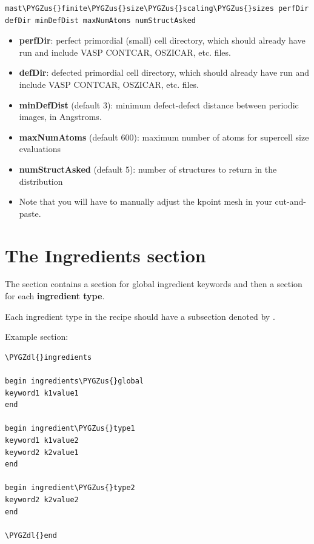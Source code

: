 \documentclass[letterpaper,10pt,english]{sphinxmanual}
\def\PYGZus{\char`\_}
\def\PYGZdl{\char`\$}
\begin{document}
\begin{Verbatim}[commandchars=\\\{\}]
mast\PYGZus{}finite\PYGZus{}size\PYGZus{}scaling\PYGZus{}sizes perfDir defDir minDefDist maxNumAtoms numStructAsked
\end{Verbatim}
\begin{itemize}
\item {} 
\textbf{perfDir}: perfect primordial (small) cell directory, which should already have run and include VASP CONTCAR, OSZICAR, etc. files.

\item {} 
\textbf{defDir}: defected primordial cell directory, which should already have run and include VASP CONTCAR, OSZICAR, etc. files.

\item {} 
\textbf{minDefDist} (default 3): minimum defect-defect distance between periodic images, in Angstroms.

\item {} 
\textbf{maxNumAtoms} (default 600): maximum number of atoms for supercell size evaluations

\item {} 
\textbf{numStructAsked} (default 5): number of structures to return in the distribution

\item {} 
Note that you will have to manually adjust the kpoint mesh in your cut-and-paste.

\end{itemize}


\section{The Ingredients section}
\label{3_1_2_ingredients::doc}\label{3_1_2_ingredients:the-ingredients-section}
The  section contains a section for global ingredient keywords and then a section for each \textbf{ingredient type}.

Each ingredient type in the recipe should have a subsection denoted by .

Example  section:

\begin{Verbatim}[commandchars=\\\{\}]
\PYGZdl{}ingredients

begin ingredients\PYGZus{}global
keyword1 k1value1
end

begin ingredient\PYGZus{}type1
keyword1 k1value2
keyword2 k2value1
end

begin ingredient\PYGZus{}type2
keyword2 k2value2
end

\PYGZdl{}end
\end{Verbatim}
\end{document}
